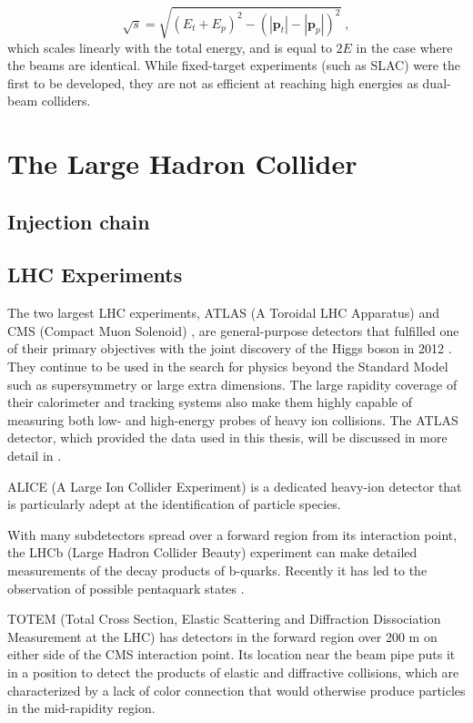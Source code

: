 \begin{equation}
\sqrt{s} = \sqrt{(E_t + E_p)^2 - (|\mathbf{p}_t| - |\mathbf{p}_p|)^2} \; ,
\end{equation}
which scales linearly with the total energy, and is equal to $2E$ in the case where the beams are identical.
While fixed-target experiments (such as SLAC) were the first to be developed, they are not as efficient at reaching high energies as dual-beam colliders.

\section{The Large Hadron Collider}
\subsection{Injection chain}
\subsection{LHC Experiments}
The two largest LHC experiments, ATLAS (A Toroidal LHC Apparatus) \cite{Aad:2008zzm} and CMS (Compact Muon Solenoid) \cite{Chatrchyan:2008aa}, are general-purpose detectors that fulfilled one of their primary objectives with the joint discovery of the Higgs boson in 2012 \cite{Aad:2012tfa,Chatrchyan:2012xdj}. They continue to be used in the search for physics beyond the Standard Model such as supersymmetry or large extra dimensions. The large rapidity coverage of their calorimeter and tracking systems also make them highly capable of measuring both low- and high-energy probes of heavy ion collisions. The ATLAS detector, which provided the data used in this thesis, will be discussed in more detail in \Sect{\ref{sec:atlas}}.

ALICE (A Large Ion Collider Experiment) \cite{Aamodt:2008zz} is a dedicated heavy-ion detector that is particularly adept at the identification of particle species.

With many subdetectors spread over a forward region from its interaction point, the LHCb (Large Hadron Collider Beauty) experiment \cite{Alves:2008zz} can make detailed measurements of the decay products of b-quarks. Recently it has led to the observation of possible pentaquark states \cite{Aaij:2015tga}.

TOTEM (Total Cross Section, Elastic Scattering and Diffraction Dissociation Measurement at the LHC) \cite{Anelli:2008zza} has detectors in the forward region over 200 m on either side of the CMS interaction point. Its location near the beam pipe puts it in a position to detect the products of elastic and diffractive collisions, which are characterized by a lack of color connection that would otherwise produce particles in the mid-rapidity region.

